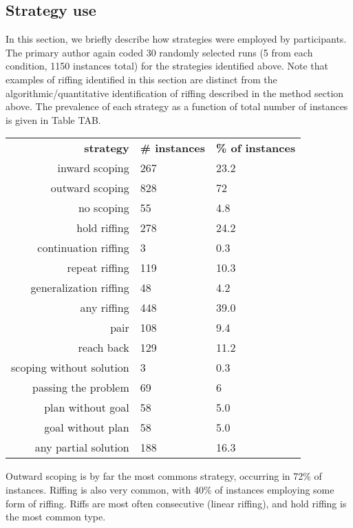 \subsection{Strategy use}

In this section, we briefly describe how strategies were employed by participants. The primary author again coded 30 randomly selected runs (5 from each condition, 1150 instances total) for the strategies identified above. Note that examples of riffing identified in this section are distinct from the algorithmic/quantitative identification of riffing described in the method section above. The prevalence of each strategy as a function of total number of instances is given in Table TAB.

\begin{table}
    \begin{tabular}{r | l l}
        \textbf{strategy} & \textbf{\# instances} & \textbf{\% of instances} \\
        inward scoping & 267 & 23.2 \\
        outward scoping & 828 & 72 \\
        no scoping & 55 & 4.8 \\
        \hline \hline
        hold riffing & 278 & 24.2 \\
        continuation riffing & 3 & 0.3 \\
        repeat riffing & 119 & 10.3 \\
        generalization riffing & 48 & 4.2 \\
        \hline
        any riffing & 448 & 39.0 \\
        pair & 108 & 9.4 \\
        reach back & 129 & 11.2 \\
        \hline \hline
        scoping without solution & 3 & 0.3 \\
        passing the problem & 69 & 6 \\
        plan without goal & 58 & 5.0 \\
        goal without plan & 58 & 5.0 \\ 
        \hline
        any partial solution & 188 & 16.3 \\
    \end{tabular}
\end{table}

Outward scoping is by far the most commons strategy, occurring in 72\% of instances. Riffing is also very common, with 40\% of instances employing some form of riffing. Riffs are most often consecutive (linear riffing), and hold riffing is the most common type.

